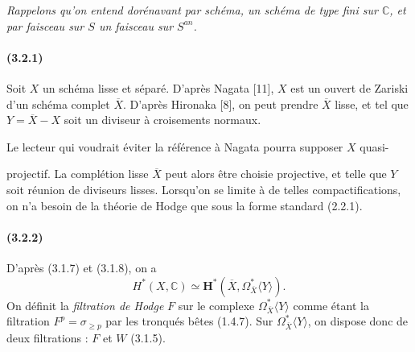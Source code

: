 \documentclass[10pt]{article}
\newcommand{\C}{\mathbb C}
\begin{document}
\emph{Rappelons qu'on entend dorénavant par schéma, un schéma de type fini sur $\C$, et par faisceau sur $S$ un faisceau sur $S^{an}$.}

\paragraph{(3.2.1)} Soit $X$ un schéma lisse et séparé. D'après Nagata [11], $X$ est un ouvert de Zariski d'un schéma complet $\overline X$. D'après Hironaka [8], on peut prendre $\overline X$ lisse, et tel que $Y=\overline X-X$ soit un diviseur à croisements normaux.

Le lecteur qui voudrait éviter la référence à Nagata pourra supposer $X$ quasi-



projectif. La complétion lisse $\overline X$ peut alors être choisie projective, et telle que $Y$ soit réunion de diviseurs lisses. Lorsqu'on se limite à de telles compactifications, on n'a besoin de la théorie de Hodge que sous la forme standard (2.2.1).

\paragraph{(3.2.2)} D'après (3.1.7) et (3.1.8), on a
\[
H^*(X,\C)\simeq \mathbf H^*(\overline X,\Omega_{\overline X}^{*}\langle Y\rangle).
\]
On définit la \emph{filtration de Hodge} $F$ sur le complexe $\Omega_{\overline X}^{*}\langle Y\rangle$ comme étant la filtration $F^p=\sigma_{\ge p}$ par les tronqués bêtes (1.4.7). Sur $\Omega_{\overline X}^{*}\langle Y\rangle$, on dispose donc de deux filtrations : $F$ et $W$ (3.1.5).
\end{document}
